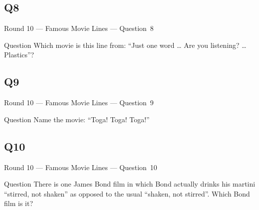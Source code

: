 \documentclass[11pt]{beamer}
\begin{document}
\subsection*{Q8}
\begin{frame}[t]{Round 10 --- Famous Movie Lines --- \mbox{Question 8}}
\vspace{-0.5em}
\begin{block}{Question}
Which movie is this line from: ``Just one word \ldots{} Are you listening? \ldots{} Plastics''?
\end{block}
\end{frame}
\subsection*{Q9}
\begin{frame}[t]{Round 10 --- Famous Movie Lines --- \mbox{Question 9}}
\vspace{-0.5em}
\begin{block}{Question}
Name the movie: ``Toga! Toga! Toga!''
\end{block}
\end{frame}
\subsection*{Q10}
\begin{frame}[t]{Round 10 --- Famous Movie Lines --- \mbox{Question 10}}
\vspace{-0.5em}
\begin{block}{Question}
There is one James Bond film in which Bond actually drinks his martini ``stirred, not shaken'' as opposed to the usual ``shaken, not stirred''. Which Bond film is it?
\end{block}
\end{frame}
\end{document}
